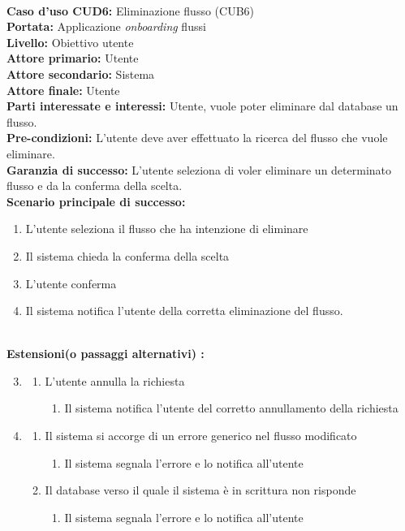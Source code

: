 \ \\
\textbf{Caso d’uso CUD6:} Eliminazione flusso (CUB6) \\
\textbf{Portata:} Applicazione \textit{onboarding} flussi\\
\textbf{Livello:} Obiettivo utente \\
\textbf{Attore primario:} Utente \\
\textbf{Attore secondario:} Sistema \\
\textbf{Attore finale:} Utente \\
\textbf{Parti interessate e interessi:} 
Utente, vuole poter eliminare dal database un flusso. \\
\textbf{Pre-condizioni:} L’utente deve aver effettuato la ricerca del flusso che vuole eliminare.\\
\textbf{Garanzia di successo:} L'utente seleziona di voler eliminare un determinato flusso e da la conferma della scelta.\\
\textbf{Scenario principale di successo:} 
\begin{enumerate}
  \item L'utente seleziona il flusso che ha intenzione di eliminare
  \item Il sistema chieda la conferma della scelta
  \item L'utente conferma
  \item Il sistema notifica l'utente della corretta eliminazione del flusso.
\end{enumerate} 
\  \\
\textbf{Estensioni(o passaggi alternativi) :}
\begin{enumerate}
\setcounter{enumi}{2}
\item
    \begin{enumerate}
        \item L'utente annulla la richiesta
        \begin{enumerate}
            \item Il sistema notifica l'utente del corretto annullamento della richiesta
        \end{enumerate}
    \end{enumerate}
 \item
     \begin{enumerate}
     \item Il sistema si accorge di un errore generico nel flusso modificato
     \begin{enumerate}
            \item Il sistema segnala l’errore e lo notifica all’utente
        \end{enumerate}
     \item Il database verso il quale il sistema è in scrittura non risponde
        \begin{enumerate}
            \item Il sistema segnala l’errore e lo notifica all’utente
        \end{enumerate}
    \end{enumerate}
 \end{enumerate} 


